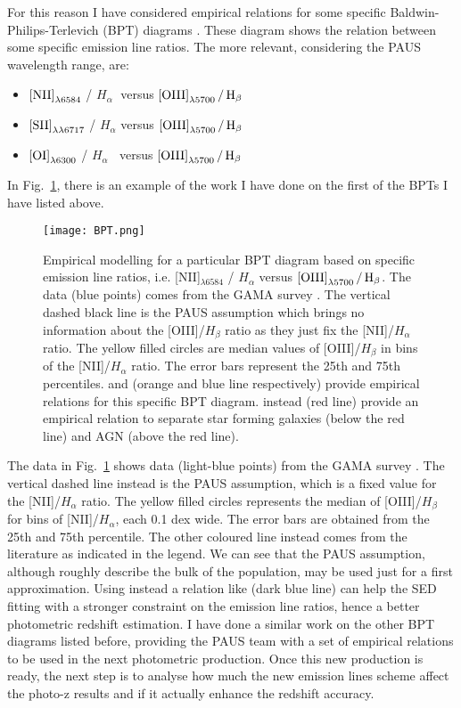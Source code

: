 \documentclass[11pt]{article}
\begin{document}
For this reason I have considered empirical relations for some specific Baldwin-Philips-Terlevich (BPT) diagrams \citep{baldwin81}. These diagram shows the relation between some specific emission line ratios. The more relevant, considering the PAUS wavelength range, are:
\begin{itemize}
\item $\rm{[NII]}_{\lambda6584}$ / $H_{\alpha}\;$ versus $\rm{[OIII]}_{\lambda 5700} \, / \, H_{\beta}$
\item $\rm{[SII]}_{\lambda\lambda6717}$ / $H_{\alpha}$ versus $\rm{[OIII]}_{\lambda 5700} \, / \, H_{\beta}$
\item $\rm{[OI]}_{\lambda6300}$  / $H_{\alpha} \;\;$ versus $\rm{[OIII]}_{\lambda 5700} \, / \, H_{\beta}$
\end{itemize}
In Fig.~\ref{fig:BPT}, there is an example of the work I have done on the first of the BPTs I have listed above.
%
\begin{figure}
\centering
\texttt{[image: BPT.png]}
\caption{Empirical modelling for a particular BPT diagram based on specific emission line ratios, i.e. [NII]$_{\lambda6584}$ / $H_{\alpha}$ versus $\rm{[OIII]}_{\lambda 5700} \, / \, H_{\beta}$. The data (blue points) comes from the GAMA survey \citep{driver11}. The vertical dashed black line is the PAUS assumption which brings no information about the [OIII]/$H_{\beta}$ ratio as they just fix the [NII]/$H_{\alpha}$ ratio. The yellow filled circles are median values of [OIII]/$H_{\beta}$ in bins of the [NII]/$H_{\alpha}$ ratio. The error bars represent the 25th and 75th percentiles. \cite{brinchmann08} and \cite{faisst18} (orange and blue line respectively) provide empirical relations for this specific BPT diagram. \cite{kewley01} instead (red line) provide an empirical relation to separate star forming galaxies (below the red line) and AGN (above the red line).}
\label{fig:BPT}
\end{figure}
%
The data in Fig.~\ref{fig:BPT} shows data (light-blue points) from the GAMA survey \citep{driver11}. The vertical dashed line instead is the PAUS assumption, which is a fixed value for the [NII]/$H_{\alpha}$ ratio. The yellow filled circles represents the median of [OIII]/$H_{\beta}$ for bins of [NII]/$H_{\alpha}$, each 0.1 dex wide. The error bars are obtained from the 25th and 75th percentile. The other coloured line instead comes from the literature as indicated in the legend. We can see that the PAUS assumption, although roughly describe the bulk of the population, may be used just for a first approximation. Using instead a relation like \citealt{faisst18} (dark blue line) can help the SED fitting with a stronger constraint on the emission line ratios, hence a better photometric redshift estimation.  
I have done a similar work on the other BPT diagrams listed before, providing the PAUS team with a set of empirical relations to be used in the next photometric production. 
Once this new production is ready, the next step is to analyse how much the new emission lines scheme affect the photo-z results and if it actually enhance the redshift accuracy.
\end{document}
